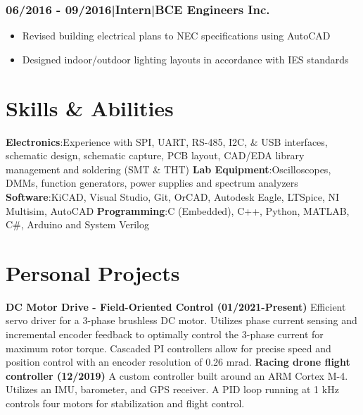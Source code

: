 \documentclass[]{article}
\begin{document}
\begin{singlespace}
\subsubsection*{06/2016 - 09/2016\hspace{3 mm}|\hspace{3 mm}Intern\hspace{3 mm}|\hspace{3 mm}BCE Engineers Inc.}
\vspace{-2mm}
\begin{itemize}
    \setlength\itemsep{0em}
    \item Revised building electrical plans to NEC specifications using AutoCAD
    \item Designed indoor/outdoor lighting layouts in accordance with IES standards 
\end{itemize}


\section*{Skills \& Abilities}

\textbf{Electronics}:\newline Experience with SPI, UART, RS-485, I2C, \& USB interfaces, schematic design, schematic capture, PCB layout,
CAD/EDA library management and soldering (SMT \& THT)
\newline\textbf{Lab Equipment}:\newline Oscilloscopes, DMMs, function generators, power supplies and spectrum analyzers
\newline\textbf{Software}:\newline KiCAD, Visual Studio, Git, OrCAD, Autodesk Eagle, LTSpice, NI Multisim, AutoCAD
\newline\textbf{Programming}:\newline C (Embedded), C++, Python, MATLAB, C\#, Arduino and System Verilog


\section*{Personal Projects}


\textbf{DC Motor Drive - Field-Oriented Control (01/2021-Present)}\newline
Efficient servo driver for a 3-phase brushless DC motor.
Utilizes phase current sensing and incremental encoder feedback to optimally control the 3-phase current for maximum rotor torque.
Cascaded PI controllers allow for precise speed and position control with an encoder resolution of 0.26 mrad.
\newline\newline
\textbf{Racing drone flight controller (12/2019)}\newline
A custom controller built around an ARM Cortex M-4. Utilizes an IMU, barometer, and GPS receiver. A PID loop
running at 1 kHz controls four motors for stabilization and flight control.



\end{singlespace}
\end{document}
